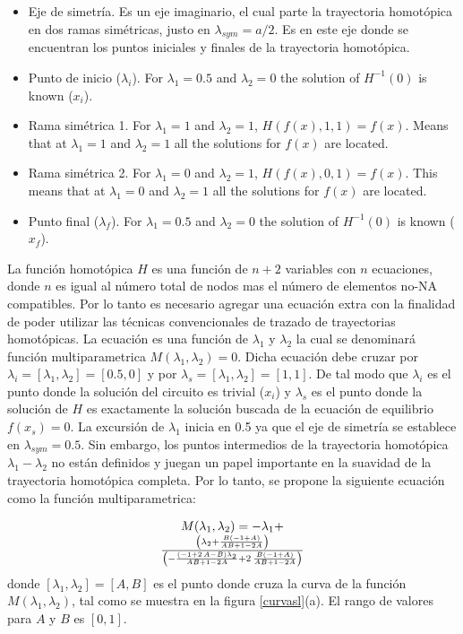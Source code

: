 \documentclass[conference,letterpaper,twocolumn]{IEEEtran}
\begin{document}
\begin{itemize}
\item Eje de simetría. Es un eje imaginario, el cual parte la trayectoria homotópica en dos ramas simétricas, justo
en $\lambda_{sym}=a/2$. Es en este eje donde se encuentran los puntos iniciales y finales de la trayectoria homotópica.
\item Punto de inicio ($\lambda_i$). For $\lambda_1=0.5$ and $\lambda_2=0$ the solution of $H^{-1}(0)$ is known ($x_i$). 
\item Rama simétrica 1. For $\lambda_1=1$ and $\lambda_2=1$, ${H}({f}({x}),1,1)={f}({x})$. Means that at $\lambda_1=1$ and $\lambda_2=1$ all the solutions for ${f}({x})$ are located.
\item Rama simétrica 2. For $\lambda_1=0$ and $\lambda_2=1$, ${H}({f}({x}),0,1 )={f}({x})$. This means that at $\lambda_1=0$ and $\lambda_2=1$ all the solutions for ${f}({x})$ are located.
\item Punto final ($\lambda_f$). For $\lambda_1=0.5$ and $\lambda_2=0$ the solution of $H^{-1}(0)$ is known ($x_f$). 
\end{itemize}




La función homot\'opica ${H}$ es una función de $n+2$ variables con $n$ ecuaciones, donde $n$ es igual al n\'umero total de nodos
mas el n\'umero de elementos no-NA compatibles. Por lo tanto es necesario agregar una ecuación extra con la finalidad
de poder utilizar las técnicas convencionales de trazado de trayectorias homot\'opicas\cite{homo_allgower}. 
La ecuación es una función de $\lambda_1$ y $\lambda_2$ la cual se denominará función multiparametrica $M(\lambda_1,\lambda_2)=0$.
Dicha ecuación debe cruzar por ${\lambda}_i=[\lambda_1,\lambda_2]=[0.5,0]$ y por ${\lambda}_s=[\lambda_1,\lambda_2]=[1,1]$. De tal modo que ${\lambda}_i$ es el punto donde la solución del circuito es trivial ($x_i$) y  ${\lambda}_s$
es el punto donde la solución de ${H}$ es exactamente la solución buscada de la ecuación de equilibrio ${f}({x}_s)=0$.
La excursión de $\lambda_1$ inicia en 0.5 ya que el eje de simetría
se establece en $\lambda_{sym}=0.5$. Sin embargo, los puntos intermedios de la trayectoria homotópica $\lambda_1-\lambda_2$ no están definidos y juegan un papel
importante en la suavidad de la trayectoria homot\'opica completa. Por lo tanto, se propone la siguiente ecuación como la función multiparametrica:

{
\begin{equation}
\begin{array}{c}
M(\lambda_1,\lambda_2)=-\lambda_{{1}}+\\ { \left( \lambda_{{2}}+{\frac {B \left( - 1+A \right) }
{AB+ 1- 2A}} \right) \over  \left( -{\frac { \left( - 1+ 2\,
A- B \right) \lambda_{{2}}}{AB+ 1- 2A}}+ 2\,{\frac {B
 \left( - 1+A \right) }{AB+ 1- 2A}} \right) }
\end{array}
\label{homotopiaPx4}
\end{equation}
}
donde $[\lambda_1,\lambda_2]=[A,B]$ es el punto donde cruza la curva de la funci\'on  $M(\lambda_1,\lambda_2)$,
tal como se muestra en la figura \ref{curvasl}(a). El rango de valores para $A$ y $B$ es $[0,1]$.
\end{document}
